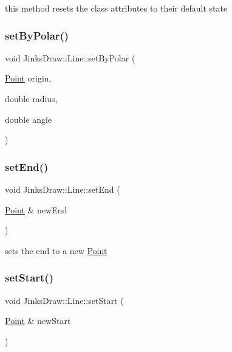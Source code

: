 this method resets the class attributes to their default state 

\mbox{\label{class_jinks_draw_1_1_line_a0b2ba2dbbdf5fb51dcf0eda0614e5259}} 
\subsubsection{\texorpdfstring{set\+By\+Polar()}{setByPolar()}}
{\footnotesize\ttfamily void Jinks\+Draw\+::\+Line\+::set\+By\+Polar (\begin{DoxyParamCaption}\item[{\mbox{\hyperlink{class_jinks_draw_1_1_point}{Point}}}]{origin,  }\item[{double}]{radius,  }\item[{double}]{angle }\end{DoxyParamCaption})}

\mbox{\label{class_jinks_draw_1_1_line_affea1d620e660a388d30808ac9404457}} 
\subsubsection{\texorpdfstring{set\+End()}{setEnd()}}
{\footnotesize\ttfamily void Jinks\+Draw\+::\+Line\+::set\+End (\begin{DoxyParamCaption}\item[{\mbox{\hyperlink{class_jinks_draw_1_1_point}{Point}} \&}]{new\+End }\end{DoxyParamCaption})}



sets the end to a new \mbox{\hyperlink{class_jinks_draw_1_1_point}{Point}} 

\mbox{\label{class_jinks_draw_1_1_line_a5afb8d3fa0f0b47529014dbfb5e9dbb6}} 
\subsubsection{\texorpdfstring{set\+Start()}{setStart()}}
{\footnotesize\ttfamily void Jinks\+Draw\+::\+Line\+::set\+Start (\begin{DoxyParamCaption}\item[{\mbox{\hyperlink{class_jinks_draw_1_1_point}{Point}} \&}]{new\+Start }\end{DoxyParamCaption})}



